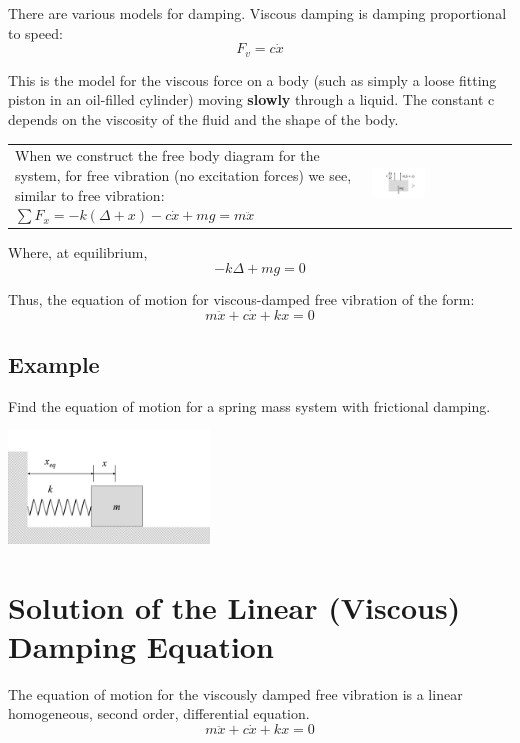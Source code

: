 \documentclass[12pt,letterpaper,twoside]{report}
\begin{document}
There are various models for damping.  Viscous damping is damping proportional to speed: 
\[
F_v = c \dot{x}
\]

This is the model for the viscous force on a body (such as simply a loose fitting piston in an oil-filled cylinder) moving \textbf{slowly} through a liquid.  The constant c depends on the viscosity of the fluid and the shape of the body.

\begin{tabu} to 1\textwidth {   X[1, l, m]  X[1, C, m]  }
When we construct the free body diagram for the system, for free vibration (no excitation forces) we see, similar to free vibration:  \newline \newline $\displaystyle \sum F_x = -k ( \Delta + x) - c \dot{x} + mg = m \ddot{x}$ & \includegraphics[trim={6cm 2cm 4cm 1cm},clip,width=0.4\textwidth, left]{Slide94}\\
\end{tabu}

Where, at equilibrium, 
\[
-k \Delta + mg = 0
\]

Thus, the equation of motion for viscous-damped free vibration of the form: 
\[
m \ddot{x} + c \dot{x} + kx = 0
\]

\subsection{Example}
Find the equation of motion for a spring mass system with frictional damping.

\includegraphics[trim={1cm 1cm 6cm 3cm},clip,width=0.4\textwidth, left]{Slide95}

\vspace*{10\baselineskip}
\newpage

\section{Solution of the Linear (Viscous) Damping Equation}
The equation of motion for the viscously damped free vibration is a linear homogeneous, second order, differential equation.
\begin{equation} \label{eq:13.1}
m \ddot{x} + c \dot{x} + kx = 0
\end{equation}
\end{document}
